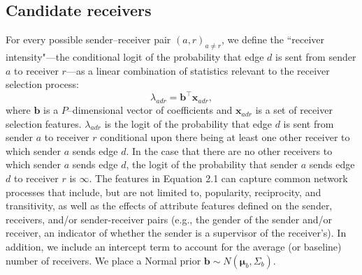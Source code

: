 \documentclass[ba]{imsart}
\numberwithin{equation}{section}
\theoremstyle{plain}
\begin{document}
	\subsection{Candidate receivers}\label{subsec: Tie}
	For every possible sender--receiver pair $(a,r)_{a \neq r}$, we define the ``receiver intensity"---the conditional logit of the probability that edge $d$ is sent from sender $a$ to receiver $r$---as a linear combination of statistics relevant to the receiver selection process:
	\begin{equation}
		\lambda_{adr} = {\boldsymbol{b}}^{\top}\boldsymbol{x}_{adr},
	\end{equation}
	where $\boldsymbol{b}$ is a $P$--dimensional vector of coefficients and $\boldsymbol{x}_{adr}$ is a set of receiver selection features. $\lambda_{adr}$ is the logit of the probability that edge $d$ is sent from sender $a$ to receiver $r$ conditional upon there being at least one other receiver to which sender $a$ sends edge $d$. In the case that there are no other receivers to which sender $a$ sends edge $d$, the logit of the probability that sender $a$ sends edge $d$ to receiver $r$ is $\infty$.  The features in Equation 2.1 can capture common network processes that include, but are not limited to, popularity, reciprocity, and transitivity, as well as the effects of attribute features defined on the sender, receivers, and/or sender-receiver pairs (e.g., the gender of the sender and/or receiver, an indicator of whether the sender is a supervisor of the receiver's). In addition, we include an intercept term to account for the average (or baseline) number of receivers. We place a Normal prior $\boldsymbol{b} \sim N(\boldsymbol{\mu}_b, \Sigma_b)$.
	
\end{document}
